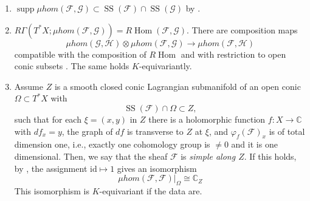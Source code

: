 \documentclass[11pt,reqno]{amsart}
\theoremstyle{definition}
\theoremstyle{remark}
\def\bbC{\mathbb C}
\def\Hom{\operatorname{Hom}}
\def\muhom{\mu hom}
\begin{document}
\begin{enumerate}[label=$\mathrm{(M\arabic*)}$,leftmargin=10mm]

\item\label{M1}  $\operatorname{supp}\muhom(\mathcal F,\mathcal G)\subset \operatorname{SS}(\mathcal F)\cap \operatorname{SS}(\mathcal G)$ by \cite[Cor.~5.4.10]{KS90}.

\item\label{M2}  $R\Gamma(T^*X;\muhom(\mathcal F,\mathcal G))=R\Hom(\mathcal F,\mathcal G)$. There are composition maps
$$\muhom(\mathcal G,\mathcal H)\otimes\muhom(\mathcal F,\mathcal G)\to\muhom(\mathcal F,\mathcal H)$$ 
compatible with the composition of $R\Hom$ and with
restriction to open conic subsets \cite[\S4.4]{KS90}.
The same holds $K$-equivariantly.

\item\label{M3} 
%
Assume $Z$ is a smooth closed conic Lagrangian submanifold of an open conic $\Omega\subset T^*X$ with
$$\operatorname{SS}(\mathcal F)\cap\Omega\subset Z,$$ such that for each 
$\xi=(x,y)$ in $Z$ there is a holomorphic function $f:X\to\mathbb C$ with $df_x=y$,
the graph of $df$ is transverse to $Z$ at $\xi$, 
and $\varphi_f(\mathcal F)_x$ is of total dimension one, i.e.,  exactly one cohomology group is $\neq 0$ and it is one dimensional.
Then, we say that the sheaf $\mathcal F$ is \emph{simple along $Z$}.
If this holds, by \cite[\S7.5]{KS90}, the assignment $\mathrm{id}\mapsto1$ gives an isomorphism 
$$\muhom(\mathcal F,\mathcal F)|_\Omega\cong\bbC_Z$$ 
This isomorphism is $K$-equivariant if the data are.


\end{enumerate}
\end{document}
